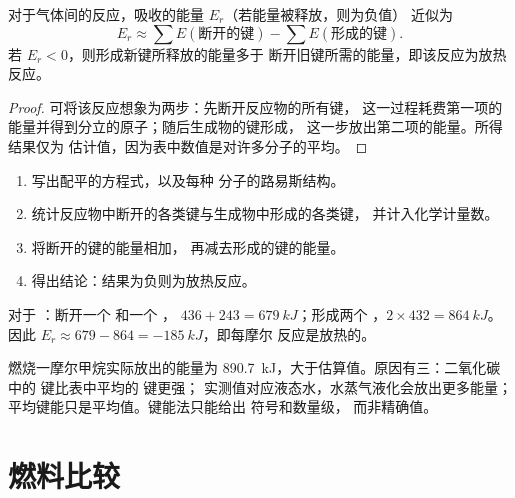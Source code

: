 \begin{proposition}[反应能量的估算]\label{prop:g11:reaction-energy:estimate}
对于气体间的反应，吸收的能量 $E_r$（若能量被释放，则为负值）
近似为
\[
  E_r \approx \sum E(\text{断开的键}) - \sum E(\text{形成的键}) .
\]
若 $E_r < 0$，则形成新键所释放的能量多于
断开旧键所需的能量，即该反应为放热反应。
\end{proposition}

\begin{proof}
可将该反应想象为两步：先断开反应物的所有键，
这一过程耗费第一项的能量并得到分立的原子；随后生成物的键形成，
这一步放出第二项的能量。所得结果仅为
估计值，因为表中数值是对许多分子的平均。
\end{proof}

\begin{method}[由键能估算反应能量]\label{met:g11:reaction-energy:bonds}
\begin{enumerate}
  \item 写出配平的方程式，以及每种
        分子的路易斯结构。
  \item 统计反应物中断开的各类键与生成物中形成的各类键，
        并计入化学计量数。
  \item 将断开的键的能量相加，
        再减去形成的键的能量。
  \item 得出结论：结果为负则为放热反应。
\end{enumerate}
\end{method}

\begin{example}[氢气与氯气]\label{ex:g11:reaction-energy:hcl}
对于 ：断开一个  和一个 ，
$436 + 243 = \qty{679}{kJ}$；形成两个 ，$2 \times 432 =
\qty{864}{kJ}$。因此 $E_r \approx 679 - 864 = \qty{-185}{kJ}$，即每摩尔
反应是放热的。
\end{example}


\begin{remark}[估算与测量]\label{rem:g11:reaction-energy:compare}
燃烧一摩尔甲烷实际放出的能量为
\qty{890.7}{kJ}，大于估算值。原因有三：二氧化碳中的 
键比表中平均的  键更强；
实测值对应液态水，水蒸气液化会放出更多能量；
平均键能只是平均值。键能法只能给出
符号和数量级，
而非精确值。
\end{remark}

\section{燃料比较}

